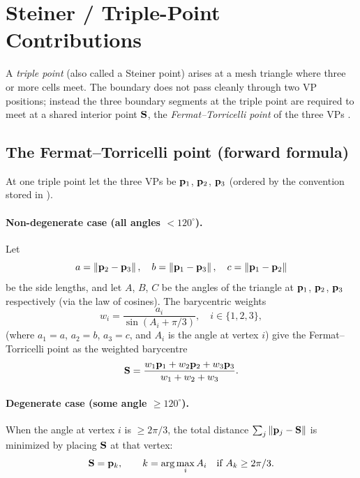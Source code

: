 \documentclass[11pt,a4paper]{article}
\begin{document}
\section{Steiner / Triple-Point Contributions}
\label{sec:steiner}

A \emph{triple point} (also called a Steiner point) arises at a mesh
triangle where three or more cells meet.  The boundary does not pass
cleanly through two VP positions; instead the three boundary segments at
the triple point are required to meet at a shared interior point $\mathbf{S}$,
the \emph{Fermat--Torricelli point} of the three VPs
\cite{kuhn1974steiner}.

\subsection{The Fermat--Torricelli point (forward formula)}
\label{sec:steiner-point}

At one triple point let the three VPs be $\mathbf{p}_{1}$, $\mathbf{p}_{2}$, $\mathbf{p}_{3}$
(ordered by the convention stored in ).

\paragraph{Non-degenerate case (all angles $< 120^\circ$).}
Let
\begin{equation}
  a = \left\|\mathbf{p}_{2}-\mathbf{p}_{3}\right\|,\quad
  b = \left\|\mathbf{p}_{1}-\mathbf{p}_{3}\right\|,\quad
  c = \left\|\mathbf{p}_{1}-\mathbf{p}_{2}\right\|
\end{equation}
be the side lengths, and let
$A$, $B$, $C$ be the angles of the triangle at $\mathbf{p}_{1}$, $\mathbf{p}_{2}$,
$\mathbf{p}_{3}$ respectively (via the law of cosines).  The barycentric weights
\begin{equation}
  w_i = \frac{a_i}{\sin(A_i + \pi/3)},
  \quad i \in \{1,2,3\},
  \label{eq:steiner-weights}
\end{equation}
(where $a_1 = a$, $a_2 = b$, $a_3 = c$, and $A_i$ is the angle at vertex
$i$) give the Fermat--Torricelli point as the weighted barycentre
\begin{equation}
  \mathbf{S} = \frac{w_1\mathbf{p}_{1} + w_2\mathbf{p}_{2} + w_3\mathbf{p}_{3}}{w_1+w_2+w_3}.
  \label{eq:steiner-bary}
\end{equation}

\paragraph{Degenerate case (some angle $\geq 120^\circ$).}
When the angle at vertex $i$ is $\geq 2\pi/3$, the total distance
$\sum_j\left\|\mathbf{p}_{j}-\mathbf{S}\right\|$ is minimized by placing $\mathbf{S}$ at that vertex:
\begin{equation}
  \mathbf{S} = \mathbf{p}_{k}, \qquad k = \arg\max_i A_i
  \quad\text{if } A_k \geq 2\pi/3.
  \label{eq:steiner-degen}
\end{equation}
\end{document}
